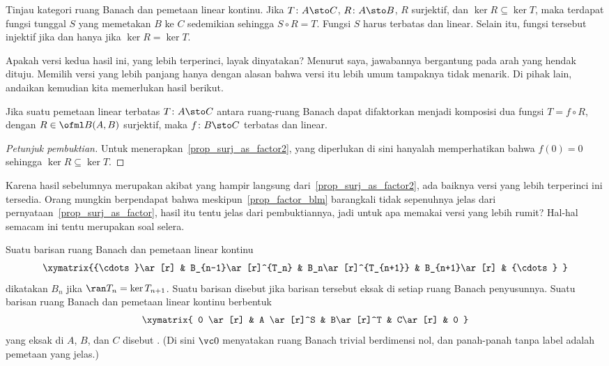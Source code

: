 \begin{prop}\label{prop_surj_as_factor2} Tinjau kategori ruang Banach
dan pemetaan linear kontinu. Jika $T\colon A \sto C$, $R\colon A \sto B$, $R$
surjektif, dan $\ker R \subseteq \ker T$, maka terdapat fungsi tunggal
$S$ yang memetakan $B$ ke $C$ sedemikian sehingga $S\circ R = T$. Fungsi $S$ harus
terbatas dan linear. Selain itu, fungsi tersebut injektif jika dan hanya jika $\ker R = \ker T$.
\end{prop}

Apakah versi kedua hasil ini, yang lebih terperinci, layak dinyatakan? Menurut saya, jawabannya bergantung pada
arah yang hendak dituju. Memilih versi yang lebih panjang hanya dengan alasan bahwa versi itu lebih umum
tampaknya tidak menarik. Di pihak lain, andaikan kemudian kita memerlukan hasil berikut.

\begin{prop}\label{prop_factor_blm} Jika suatu pemetaan linear terbatas $T\colon A \sto C$ antara ruang-ruang Banach dapat difaktorkan
menjadi komposisi dua fungsi $T = f \circ R$, dengan $R \in \ofml B(A,B)$ surjektif,
maka $f \colon B \sto C$ terbatas dan linear.
\end{prop}

\begin{proof}[\emph{Petunjuk pembuktian}] Untuk menerapkan~\ref{prop_surj_as_factor2}, yang diperlukan di sini hanyalah
memperhatikan bahwa $f(0) = 0$ sehingga $\ker R \subseteq \ker T$.   \ns
\end{proof}

Karena hasil sebelumnya merupakan akibat yang hampir langsung dari~\ref{prop_surj_as_factor2}, ada baiknya
versi yang lebih terperinci ini tersedia. Orang mungkin berpendapat bahwa meskipun~\ref{prop_factor_blm} barangkali tidak
sepenuhnya jelas dari pernyataan~\ref{prop_surj_as_factor}, hasil itu tentu jelas dari
pembuktiannya, jadi untuk apa memakai versi yang lebih rumit? Hal-hal semacam ini tentu merupakan soal selera.

\begin{defn}\label{defn_Bsp_exact_seq} Suatu barisan ruang Banach dan pemetaan linear kontinu
   \[\xymatrix{{\cdots}\ar[r] & B_{n-1}\ar[r]^{T_n}
          & B_n\ar[r]^{T_{n+1}} & B_{n+1}\ar[r] & {\cdots}
   }\]
dikatakan
 $B_n$ jika $\ran T_n = \ker T_{n+1}$. Suatu barisan disebut  jika barisan tersebut
eksak di setiap ruang Banach penyusunnya. Suatu barisan ruang Banach dan
pemetaan linear kontinu berbentuk
   \begin{equation}\label{001500202i}\xymatrix{
      0 \ar[r] & A \ar[r]^S & B\ar[r]^T & C\ar[r] & 0
   }\end{equation}
yang eksak di $A$, $B$, dan $C$ disebut . (Di sini $\vc 0$ menyatakan ruang Banach trivial
berdimensi nol, dan panah-panah tanpa label adalah pemetaan yang jelas.)
\end{defn}

